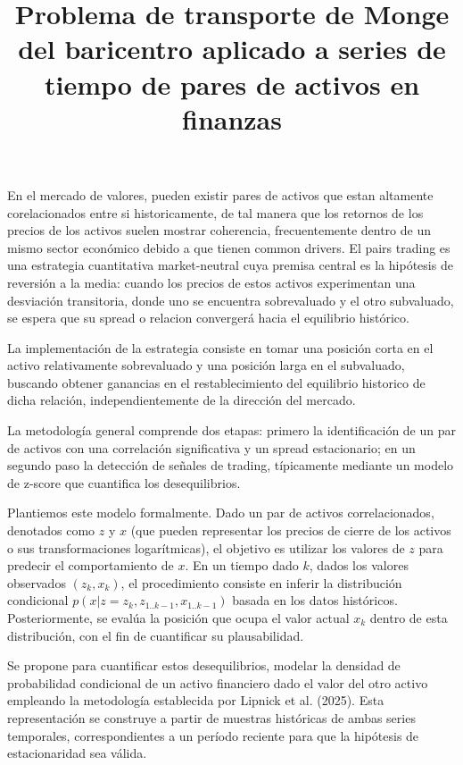 \documentclass{myarticle}
\title{Problema de transporte de Monge del baricentro aplicado a series de tiempo de pares de activos en finanzas}
\begin{document}
\maketitle

En el mercado de valores, pueden existir pares de activos que estan altamente corelacionados entre si historicamente,  de tal manera que los retornos de los precios de los activos suelen mostrar coherencia, frecuentemente dentro de un mismo sector económico debido a que tienen common drivers.  El pairs trading es una estrategia cuantitativa market-neutral cuya premisa central es la hipótesis de reversión a la media: cuando los precios de estos activos experimentan una desviación transitoria, donde uno se encuentra sobrevaluado y el otro subvaluado, se espera que su spread o relacion convergerá hacia el equilibrio histórico.

La implementación de la estrategia consiste en tomar una posición corta en el activo relativamente sobrevaluado y una posición larga en el subvaluado, buscando obtener ganancias en el restablecimiento del equilibrio historico de dicha relación, independientemente de la dirección del mercado.

La metodología general comprende dos etapas: primero la identificación de un par de activos con una correlación significativa y un spread estacionario; en un segundo paso la detección de señales de trading, típicamente mediante un modelo de z-score que cuantifica los desequilibrios.

Plantiemos este modelo formalmente. Dado un par de activos correlacionados, denotados como \( z \) y \( x \) (que pueden representar los precios de cierre de los activos o sus transformaciones logarítmicas), el objetivo es utilizar los valores de $z$ para predecir el comportamiento de \( x \). En un tiempo dado \( k \), dados los valores observados \( (z_k, x_k) \), el procedimiento consiste en inferir la distribución condicional \( p(x | z = z_k, z_{1..k-1},x_{1..k-1}) \) basada en los datos hist\'oricos. %
Posteriormente, se evalúa la posición que ocupa el valor actual \( x_k \) dentro de esta distribución, con el fin de cuantificar su plausabilidad.

Se propone para cuantificar estos desequilibrios, modelar la densidad de probabilidad condicional de un activo financiero dado el valor del otro activo empleando la metodología establecida por Lipnick et al. (2025). Esta representación se construye a partir de muestras históricas de ambas series temporales, correspondientes a un período reciente para que la hip\'otesis de estacionaridad sea v\'alida.
\end{document}
